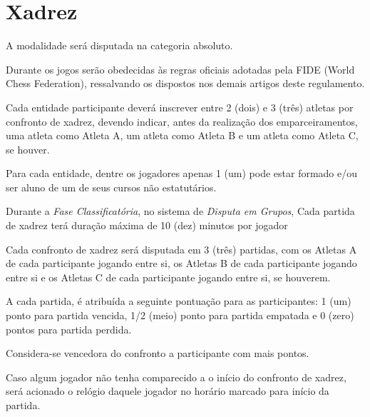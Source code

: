 {\let\clearpage\relax \chapter{Xadrez}}

\begin{article}
	A modalidade será disputada na categoria absoluto.
\end{article}

\begin{article}
	Durante os jogos serão obedecidas às regras oficiais adotadas pela FIDE (World Chess Federation), ressalvando os dispostos nos demais artigos deste regulamento.
\end{article}

\begin{article}
	Cada entidade participante deverá inscrever entre 2 (dois) e 3 (três) atletas por confronto de xadrez, devendo indicar, antes da realização dos emparceiramentos, uma atleta como Atleta A, um atleta como Atleta B e um atleta como Atleta C, se houver.
	
	\begin{xparagraph}
	    Para cada entidade, dentre os jogadores apenas 1 (um) pode estar formado e/ou ser aluno de um de seus cursos não estatutários.
	\end{xparagraph}
\end{article}

\begin{article}
	Durante a \textit{Fase Classificatória}, no sistema de \textit{Disputa em Grupos}, Cada partida de xadrez terá duração máxima de 10 (dez) minutos por jogador
\end{article}

\begin{article}
	Cada confronto de xadrez será disputada em 3 (três) partidas, com os Atletas A de cada participante jogando entre si, os Atletas B de cada participante jogando entre si e os Atletas C de cada participante jogando entre si, se houverem.

	\begin{xparagraph}
		A cada partida, é atribuída a seguinte pontuação para as participantes: 1 (um) ponto para partida vencida, 1/2 (meio) ponto para partida empatada e 0 (zero) pontos para partida perdida.
	\end{xparagraph}

	\begin{xparagraph}
		Considera-se vencedora do confronto a participante com mais pontos.
	\end{xparagraph}

	\begin{xparagraph}
		Caso algum jogador não tenha comparecido a o início do confronto de xadrez, será acionado o relógio daquele jogador no horário marcado para início da partida.
	\end{xparagraph}
\end{article}

